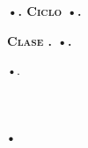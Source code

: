 \documentclass[12pt,letterpaper]{article}
\begin{document}
\noindent
\textbf{\textsc{•. Ciclo •.}}

\noindent
\textbf{\textsc{Clase \•. •.}}

\noindent
\textsc{•.}

\section{.}
\end{document}

